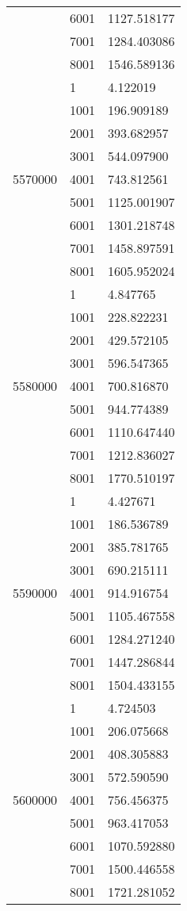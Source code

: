 \begin{table}[htb!]
\begin{tabular}{lll}
 & 6001 & 1127.518177 \\
 & 7001 & 1284.403086 \\
 & 8001 & 1546.589136 \\
\multirow[c]{9}{*}{5570000} & 1 & 4.122019 \\
 & 1001 & 196.909189 \\
 & 2001 & 393.682957 \\
 & 3001 & 544.097900 \\
 & 4001 & 743.812561 \\
 & 5001 & 1125.001907 \\
 & 6001 & 1301.218748 \\
 & 7001 & 1458.897591 \\
 & 8001 & 1605.952024 \\
\multirow[c]{9}{*}{5580000} & 1 & 4.847765 \\
 & 1001 & 228.822231 \\
 & 2001 & 429.572105 \\
 & 3001 & 596.547365 \\
 & 4001 & 700.816870 \\
 & 5001 & 944.774389 \\
 & 6001 & 1110.647440 \\
 & 7001 & 1212.836027 \\
 & 8001 & 1770.510197 \\
\multirow[c]{9}{*}{5590000} & 1 & 4.427671 \\
 & 1001 & 186.536789 \\
 & 2001 & 385.781765 \\
 & 3001 & 690.215111 \\
 & 4001 & 914.916754 \\
 & 5001 & 1105.467558 \\
 & 6001 & 1284.271240 \\
 & 7001 & 1447.286844 \\
 & 8001 & 1504.433155 \\
\multirow[c]{9}{*}{5600000} & 1 & 4.724503 \\
 & 1001 & 206.075668 \\
 & 2001 & 408.305883 \\
 & 3001 & 572.590590 \\
 & 4001 & 756.456375 \\
 & 5001 & 963.417053 \\
 & 6001 & 1070.592880 \\
 & 7001 & 1500.446558 \\
 & 8001 & 1721.281052 \\

\end{tabular}
\end{table}
